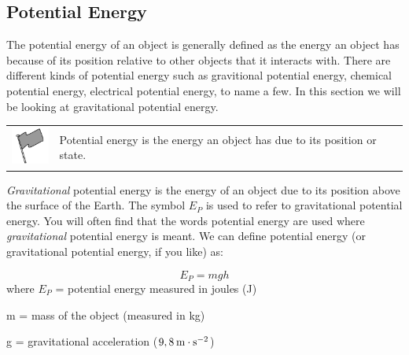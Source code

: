             \subsection{ Potential Energy}
            \nopagebreak
      \label{m38784*id66142}The potential energy of an object is generally defined as the energy an object has because of its position relative to other objects that it interacts with. There are different kinds of potential energy such as gravitional potential energy, chemical potential energy, electrical potential energy, to name a few. In this section we will be looking at gravitational potential energy.\par 
\label{m38784*fhsst!!!underscore!!!id907}\begin{definition}
	  \begin{tabular*}{15 cm}{m{15 mm}m{}}
	\hspace*{-50pt}  \includegraphics[width=0.5in]{col11305.imgs/psflag2.png}   & \Definition{   \label{id2552726}\textbf{ Potential energy }} { \label{m38784*meaningfhsst!!!underscore!!!id907}
      \label{m38784*id66155}Potential energy is the energy an object has due to its position or state. \par 
       } 
      \end{tabular*}
      \end{definition}
      \label{m38784*id66167}\textsl{Gravitational} potential energy is the energy of an object due to its position above the surface of the Earth. The symbol ${E}_{P}$ is used to refer to gravitational potential energy. You will often find that the words potential energy are used where \textsl{gravitational} potential energy is meant. We can define potential energy (or gravitational potential energy, if you like) as:\par 
      \label{m38784*uid45}\nopagebreak\noindent{}
    \begin{equation}
    {E}_{P}=mgh\tag{21.1}
      \end{equation}
      \label{m38784*id66223}where
${E}_{P}$ = potential energy measured in joules (J)\par 
      \label{m38784*id66229}m = mass of the object (measured in kg)\par 
      \label{m38784*id66234}g = gravitational acceleration ($9,8\phantom{\rule{2pt}{0ex}}\mathrm{m}\ensuremath{\cdot}\mathrm{s}{}^{-2}$)\par 
